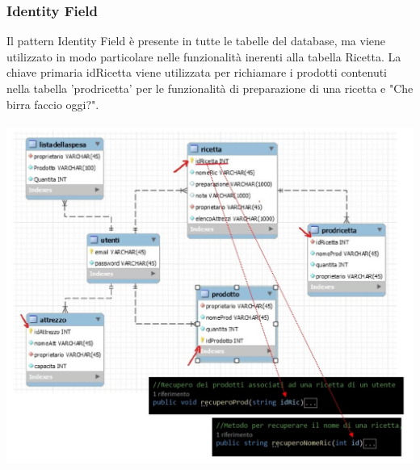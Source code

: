 \documentclass[a4paper, titlepage]{article}
\begin{document}
\subsubsection{Identity Field}
Il pattern Identity Field è presente in tutte le tabelle del database, ma viene utilizzato in modo particolare nelle funzionalità inerenti alla tabella Ricetta.
La chiave primaria idRicetta viene utilizzata per richiamare i prodotti contenuti nella tabella 'prodricetta' per le funzionalità di preparazione di una ricetta e "Che birra faccio oggi?".\\\\
\includegraphics[scale=0.40]{Immagini/IdentityField.jpg}
\end{document}
